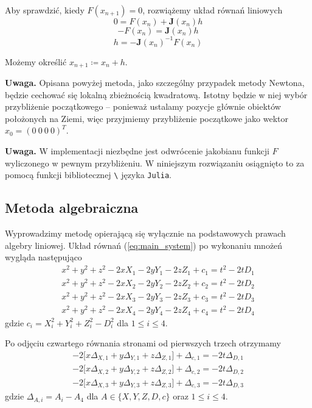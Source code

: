 \documentclass{article}
\begin{document}
Aby sprawdzić, kiedy $F(x_{n+1}) = 0$, rozwiążemy układ równań liniowych
$$0 = F(x_n) + \mathbf{J}(x_n)h $$
$$-F(x_n) = \mathbf{J}(x_n)h $$
$$h = -\mathbf{J}(x_n)^{-1}F(x_n)$$

Możemy określić $x_{n+1} \coloneqq x_n + h$.

\textbf{Uwaga.} \enspace Opisana powyżej metoda, jako szczególny przypadek metody Newtona, będzie cechować
się lokalną zbieżnością kwadratową. Istotny będzie w niej wybór przybliżenie początkowego -- ponieważ ustalamy
pozycje głównie obiektów położonych na Ziemi, więc przyjmiemy przybliżenie początkowe jako wektor $x_0 = (0 \ 0 \ 0 \ 0)^T$.

\textbf{Uwaga.} \enspace W implementacji niezbędne jest odwrócenie jakobianu funkcji $F$ wyliczonego w
pewnym przybliżeniu. W niniejszym rozwiązaniu osiągnięto to za pomocą funkcji bibliotecznej \texttt{\textbackslash}
języka \texttt{Julia}.

\subsection{Metoda algebraiczna}
Wyprowadzimy metodę opierającą się wyłącznie na podstawowych prawach algebry liniowej.
Układ równań (\ref{eq:main_system}) po wykonaniu mnożeń wygląda następująco
\begin{equation}
\begin{aligned}
    x^2 + y^2 + z^2 -2xX_1 -2yY_1 -2zZ_1 + c_1 = t^2 -2tD_1 \\
    x^2 + y^2 + z^2 -2xX_2 -2yY_2 -2zZ_2 + c_2 = t^2 -2tD_2 \\
    x^2 + y^2 + z^2 -2xX_3 -2yY_3 -2zZ_3 + c_3 = t^2 -2tD_3 \\
    x^2 + y^2 + z^2 -2xX_4 -2yY_4 -2zZ_4 + c_4 = t^2 -2tD_4
\end{aligned}
\end{equation}
gdzie $c_i=X_i^2+Y_i^2+Z_i^2-D_i^2$ dla $1 \leq i \leq 4$.

Po odjęciu czwartego równania stronami od pierwszych trzech otrzymamy
\begin{equation}
\begin{aligned}
    \label{eq:modified_system}
    -2\big[ x\Delta_{X,1} + y\Delta_{Y, 1} + z\Delta_{Z, 1} ] + \Delta_{c, 1} = -2t\Delta_{D, 1} \\
    -2\big[ x\Delta_{X,2} + y\Delta_{Y, 2} + z\Delta_{Z, 2} ] + \Delta_{c, 2} = -2t\Delta_{D, 2} \\
    -2\big[ x\Delta_{X,3} + y\Delta_{Y, 3} + z\Delta_{Z, 3} ] + \Delta_{c, 3} = -2t\Delta_{D, 3}
\end{aligned}
\end{equation}
gdzie $\Delta_{A, i} = A_i - A_4$ dla $A \in \{X, Y, Z, D, c\}$ oraz $1 \leq i \leq 4$.
\end{document}
